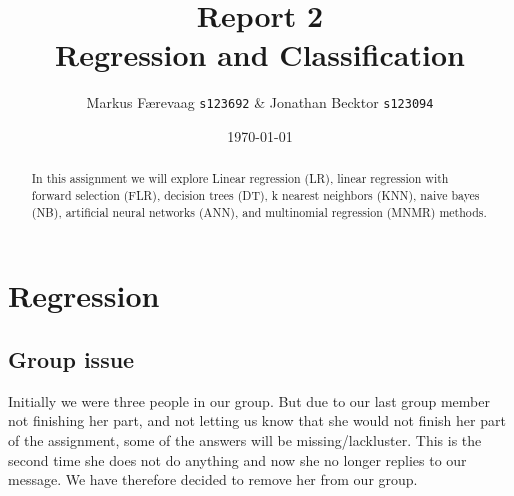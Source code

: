 \documentclass[11pt, paper=a4]{article}
\begin{document}

\title{{Report 2}\\{\bf Regression and Classification}}

\author{Markus Færevaag {\tt s123692} \& Jonathan Becktor {\tt s123094}}

\date{\today}

\maketitle

\begin{abstract}
  In this assignment we will explore Linear regression (LR), linear
  regression with forward selection (FLR), decision trees (DT), k
  nearest neighbors (KNN), naive bayes (NB), artificial neural networks
  (ANN), and multinomial regression (MNMR) methods.


\end{abstract}


\section{Regression}
\label{sec:regression}
\subsection{Group issue}
Initially we were three people in our group. But due to our last group
member not finishing her part, and not letting us know that she would not
finish her part of the assignment, some of the answers will be
missing/lackluster. This is the second time she does not do
anything and now she no longer replies to our message. We have
therefore decided to remove her from our group.
\end{document}
